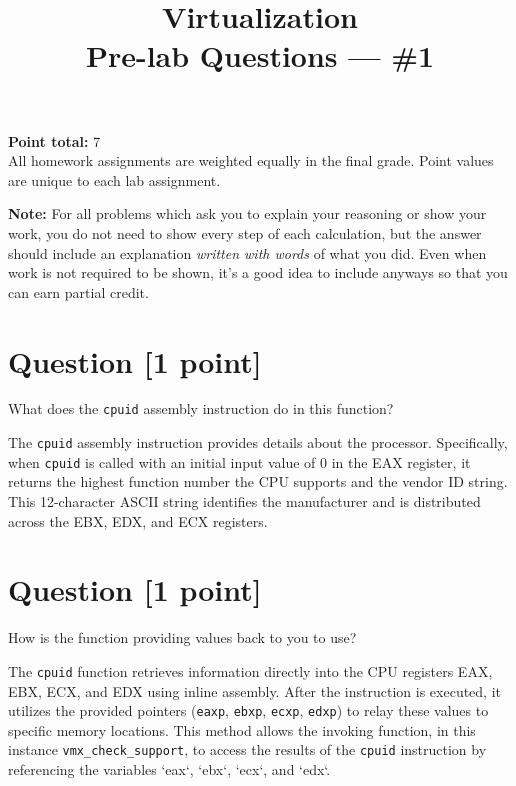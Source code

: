 \documentclass[11pt]{article}
\providecommand{\due}{}
\begin{document}
\title{Virtualization\\Pre-lab Questions --- \#1}
\date{\due}

\maketitle

\noindent \textbf{Point total:} 7
\\ All homework assignments are weighted equally in the final grade. Point values are unique to each lab assignment.

\textbf{Note:} For all problems which ask you to explain your reasoning or show your work, you do not need to show every step of each calculation, but the answer should include an explanation \emph{written with words} of what you did.  Even when work is not required to be shown, it’s a good idea to include anyways so that you can earn partial credit.

\section{Question [1 point]}

What does the \texttt{cpuid} assembly instruction do in this function?

\begin{solution}
    \item The \texttt{cpuid} assembly instruction provides details about the processor. Specifically, when \texttt{cpuid} is called with an initial input value of 0 in the EAX register, it returns the highest function number the CPU supports and the vendor ID string. This 12-character ASCII string identifies the manufacturer and is distributed across the EBX, EDX, and ECX registers.
\end{solution}


\section{Question [1 point]}

How is the function providing values back to you to use?

\begin{solution}
    \item The \texttt{cpuid} function retrieves information directly into the CPU registers EAX, EBX, ECX, and EDX using inline assembly. After the instruction is executed, it utilizes the provided pointers (\texttt{eaxp}, \texttt{ebxp}, \texttt{ecxp}, \texttt{edxp}) to relay these values to specific memory locations. This method allows the invoking function, in this instance \texttt{vmx\_check\_support}, to access the results of the \texttt{cpuid} instruction by referencing the variables `eax`, `ebx`, `ecx`, and `edx`.

\end{solution}
\end{document}
